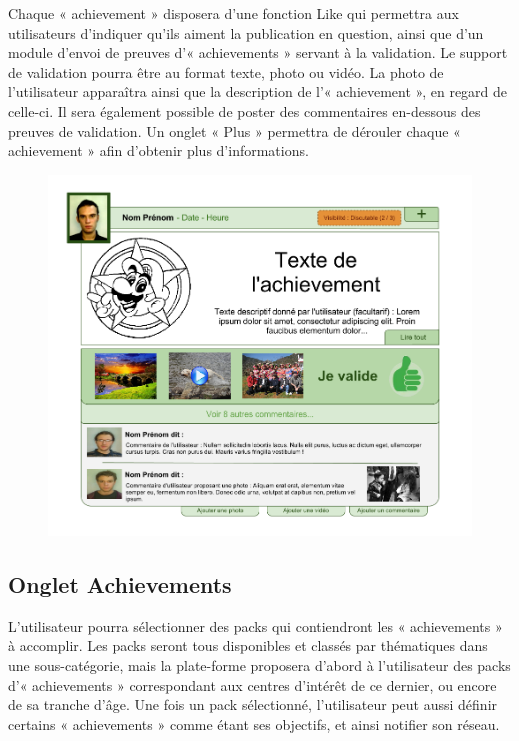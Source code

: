 \documentclass{life-fr}
\begin{document}
Chaque « achievement » disposera d'une fonction Like qui permettra aux utilisateurs d'indiquer qu'ils aiment la publication en question, ainsi que d'un module d'envoi de preuves d'« achievements » servant à la validation. Le support de validation pourra être au format texte, photo ou vidéo. La photo de l'utilisateur apparaîtra ainsi que la description de l'« achievement », en regard de celle-ci. Il sera également possible de poster des commentaires en-dessous des preuves de validation. Un onglet « Plus » permettra de dérouler chaque « achievement » afin d'obtenir plus d'informations.\\

\begin{figure}[H]
  \begin{center}
    \includegraphics[width=15cm]{img/achievement.png}
  \end{center}
\end{figure}

\subsection{Onglet Achievements}

L'utilisateur pourra sélectionner des packs qui contiendront les « achievements » à accomplir. Les packs seront tous disponibles et classés par thématiques dans une sous-catégorie, mais la plate-forme proposera d'abord à l'utilisateur des packs d'« achievements » correspondant aux centres d'intérêt de ce dernier, ou encore de sa tranche d'âge. Une fois un pack sélectionné, l'utilisateur peut aussi définir certains « achievements » comme étant ses objectifs, et ainsi notifier son réseau.
\end{document}
